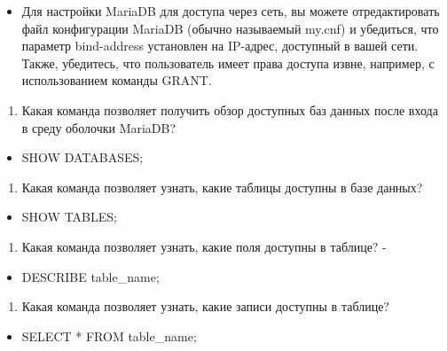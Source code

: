 \documentclass[
  12pt,
  a4paper,
  DIV=11,
  numbers=noendperiod]{scrreprt}
\providecommand{\tightlist}{%
  \setlength{\itemsep}{0pt}\setlength{\parskip}{0pt}}\usepackage{longtable,booktabs,array}
\begin{document}
\begin{itemize}
\tightlist
\item
  Для настройки MariaDB для доступа через сеть, вы можете
  отредактировать файл конфигурации MariaDB (обычно называемый my.cnf) и
  убедиться, что параметр bind-address установлен на IP-адрес, доступный
  в вашей сети. Также, убедитесь, что пользователь имеет права доступа
  извне, например, с использованием команды GRANT.
\end{itemize}

\begin{enumerate}
\def\labelenumi{\arabic{enumi}.}
\setcounter{enumi}{2}
\tightlist
\item
  Какая команда позволяет получить обзор доступных баз данных после
  входа в среду оболочки MariaDB?
\end{enumerate}

\begin{itemize}
\tightlist
\item
  SHOW DATABASES;
\end{itemize}

\begin{enumerate}
\def\labelenumi{\arabic{enumi}.}
\setcounter{enumi}{3}
\tightlist
\item
  Какая команда позволяет узнать, какие таблицы доступны в базе данных?
\end{enumerate}

\begin{itemize}
\tightlist
\item
  SHOW TABLES;
\end{itemize}

\begin{enumerate}
\def\labelenumi{\arabic{enumi}.}
\setcounter{enumi}{4}
\tightlist
\item
  Какая команда позволяет узнать, какие поля доступны в таблице? -
\end{enumerate}

\begin{itemize}
\tightlist
\item
  DESCRIBE table\_name;
\end{itemize}

\begin{enumerate}
\def\labelenumi{\arabic{enumi}.}
\setcounter{enumi}{5}
\tightlist
\item
  Какая команда позволяет узнать, какие записи доступны в таблице?
\end{enumerate}

\begin{itemize}
\tightlist
\item
  SELECT * FROM table\_name;
\end{itemize}
\end{document}
